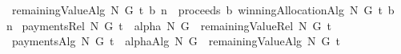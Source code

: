 \begin{isabellebody}
\isanewline
\isanewline
{}\isamarkupfalse%
\ {\isachardoublequoteopen}remainingValueAlg\ N\ G\ t\ b\ n\ {\isacharequal}{\isacharequal}\ proceeds\ b\ {\isacharparenleft}{\isacharparenleft}winningAllocationAlg\ N\ G\ t\ b{\isacharparenright}\ {\isacharminus}{\isacharminus}\ n{\isacharparenright}{\isachardoublequoteclose}\isanewline
\isanewline
\isanewline
{}\isamarkupfalse%
\ {\isachardoublequoteopen}paymentsRel\ N\ G\ t\ {\isacharequal}{\isacharequal}\ {\isacharparenleft}alpha\ N\ G{\isacharparenright}\ {\isacharminus}\ {\isacharparenleft}remainingValueRel\ N\ G\ t{\isacharparenright}{\isachardoublequoteclose}\isanewline
\isanewline
\isanewline
{}\isamarkupfalse%
\ {\isachardoublequoteopen}paymentsAlg\ N\ G\ t\ {\isacharequal}{\isacharequal}\ {\isacharparenleft}alphaAlg\ N\ G{\isacharparenright}\ {\isacharminus}\ {\isacharparenleft}remainingValueAlg\ N\ G\ t{\isacharparenright}{\isachardoublequoteclose}\isanewline
%
\isadelimtheory
\isanewline
%
\endisadelimtheory
%
\isatagtheory
{}\isamarkupfalse%
%
\endisatagtheory
{\isafoldtheory}%
%
\isadelimtheory
%
\endisadelimtheory
\end{isabellebody}%
